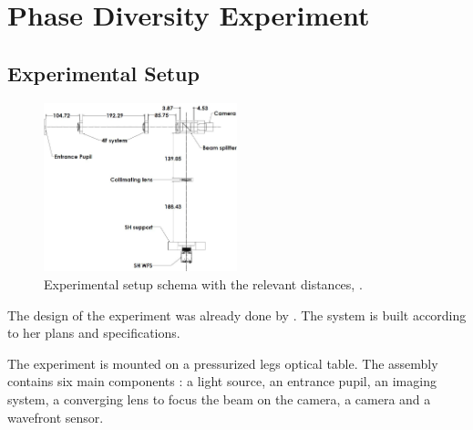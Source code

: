 \chapter{Phase Diversity Experiment} 

\label{ch:PDExp}


\section{Experimental Setup}
\begin{figure}
\centering
\includegraphics[width=0.5\textwidth]{Figures/setupSchema.JPG}
\decoRulewrapFig
\caption[Schema of the experimental setup]{Experimental setup schema with the relevant distances, \citep{Bouxin_PDM}.}
\label{fig:setupSchema}
\end{figure}

The design of the experiment was already done by \citet{Bouxin_PDM}. The system is built according to her plans and specifications.

The experiment is mounted on a pressurized legs optical table. The assembly contains six main components : a light source, an entrance pupil, an imaging system, a converging lens to focus the beam on the camera, a camera and a wavefront sensor.


